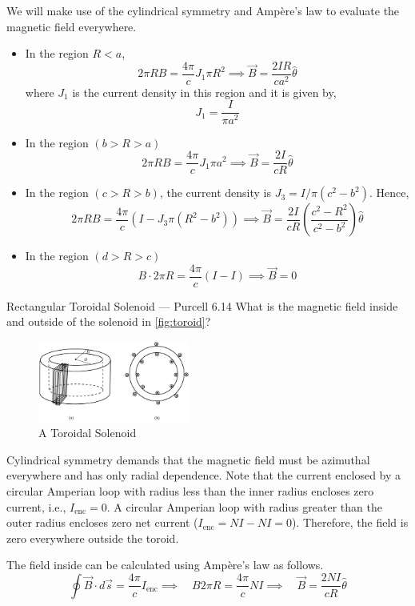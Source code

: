 \documentclass[makesolutionspdf]{esg8022pset}
\begin{document}
\begin{solution}
  We will make use of the cylindrical symmetry and Amp\`{e}re's law to evaluate the magnetic field everywhere. 
  \begin{itemize}
    \item In the region $R<a$,
      $$2\pi R B = \frac{4\pi}{c} J_1\pi R^2 \implies \vec{B} = \frac{2IR}{ca^2}\hat{\theta}$$
      where $J_1$ is the current density in this region and it is given by,
      $$J_{1} = \frac{I}{\pi a^{2}}$$
    \item
      In the region $(b > R > a)$ $$  2\pi R B = \frac{4\pi}{c} J_1\pi a^2
      \implies \vec{B} = \frac{2I}{cR}\hat{\theta}$$
    \item
      In the region $(c > R > b)$, the current density is $J_{3} = I/\pi ( c^2 - b^2 )$. Hence,
      $$2\pi R B = \frac{4\pi}{c} ( I  -
      J_3\pi(R^2-b^2)) \implies \vec{B} =
      \frac{2I}{cR}\left(\frac{c^2 - R^2}{c^2 -b^2}\right)\hat{\theta}$$
    \item
      In the region $(d > R > c)$ $$ B\cdot 2\pi R = \frac{4\pi}{c} ( I - I) \implies \vec{B} = 0 $$
  \end{itemize}
\end{solution}





\begin{problem}{Rectangular Toroidal Solenoid --- Purcell 6.14}
  What is the magnetic field inside and outside of the solenoid in \autoref{fig:toroid}?
  \begin{figure}[H]
    \centering
    \includegraphics[width = 5cm]{Toroid} 
    \caption{A Toroidal Solenoid}
    \label{fig:toroid}
  \end{figure}
\end{problem}

\begin{solution}
  Cylindrical symmetry demands that the magnetic field must be azimuthal
  everywhere and has only radial dependence.  Note that the current enclosed by
  a circular Amperian loop with radius less than the inner radius encloses zero
  current, i.e., $I_{\text{enc}} = 0$.  A circular Amperian loop with radius
  greater than the outer radius encloses zero net current ($I_{\text{enc}} = NI
  - NI = 0$). Therefore, the field is zero everywhere outside the toroid.

  The field inside can be calculated using Amp\`{e}re's law as follows.
  $$\oint \vec{B} \cdot d\vec{s} = \frac{4\pi}{c}I_{\text{enc}}  \implies \quad B 2 \pi R
  = \frac{4\pi}{c}NI  \implies \quad \vec{B} =
  \frac{2NI}{cR}\hat{\theta} $$
\end{solution}
\end{document}
